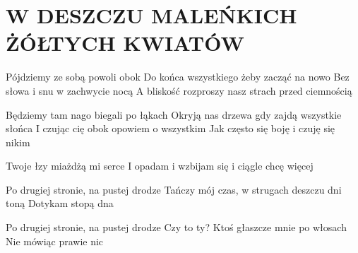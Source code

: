 \documentclass[../../../songbook.tex]{subfiles}
\begin{document}
\TabPositions{8cm} %
\section*{W DESZCZU MALEŃKICH ŻÓŁTYCH KWIATÓW}
{}
\vspace{0.5cm}
Pójdziemy ze sobą powoli obok						 \newline
Do końca wszystkiego żeby zacząć na nowo			 \newline
Bez słowa i snu w zachwycie nocą                                    \newline         
A bliskość rozproszy nasz strach przed ciemnością                 \newline

Będziemy tam nago biegali po łąkach                       \newline           
Okryją nas drzewa gdy zajdą wszystkie słońca                   \newline
I czując cię obok opowiem o wszystkim                 \newline
Jak często się boję i czuję się nikim                    \newline      

Twoje łzy miażdżą mi serce                      \newline
I opadam i wzbijam się i ciągle chcę więcej     \newline

\-\hspace{0.5cm} Po drugiej stronie, na pustej drodze				 \newline
\-\hspace{0.5cm} Tańczy mój czas, w strugach deszczu dni toną		 \newline
\-\hspace{0.5cm} Dotykam stopą dna								 \newline

\-\hspace{0.5cm} Po drugiej stronie, na pustej drodze               \newline
\-\hspace{0.5cm} Czy to ty? Ktoś głaszcze mnie po włosach               \newline
\-\hspace{0.5cm} Nie mówiąc prawie nic               \newline
\end{document}
